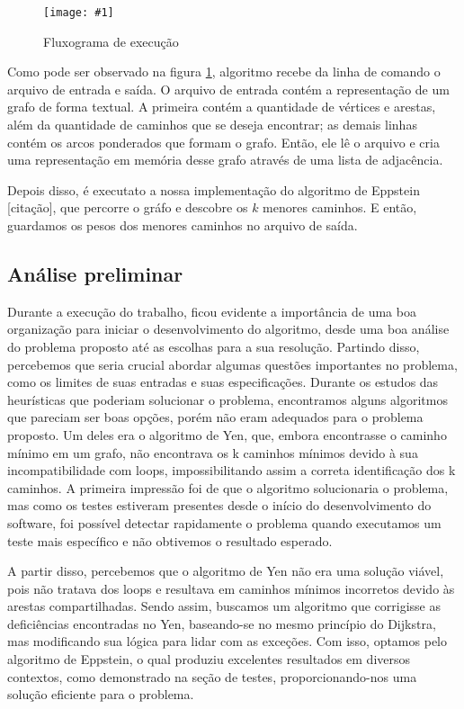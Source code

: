 \documentclass[12pt]{article}
\newcommand\image[2]{\noindent \begin{figure}[h]
    \texttt{[image: \#1]}
    \caption{#2}
    \label{fig: #1}
    \end{figure}
    }
\begin{document}
    \image{fluxo}{Fluxograma de execução}

    Como pode ser observado na figura \ref{fig: fluxo}, algoritmo recebe da linha de
    comando o arquivo de entrada e saída. O arquivo de entrada contém a
    representação de um grafo de forma textual. A primeira contém a quantidade
    de vértices e arestas, além da quantidade de caminhos que se deseja
    encontrar; as demais linhas contém os arcos ponderados que formam o grafo.
    Então, ele lê o arquivo e cria uma representação em memória desse grafo
    através de uma lista de adjacência.

    Depois disso, é executato a nossa implementação do algoritmo de Eppstein
    [citação], que percorre o gráfo e descobre os $k$ menores caminhos. E então,
    guardamos os pesos dos menores caminhos no arquivo de saída.

    \subsection{Análise preliminar}

    Durante a execução do trabalho, ficou evidente a importância de uma boa organização para iniciar o desenvolvimento do algoritmo, desde uma boa análise do problema proposto até as escolhas para a sua resolução. Partindo disso, percebemos que seria crucial abordar algumas questões importantes no problema, como os limites de suas entradas e suas especificações. Durante os estudos das heurísticas que poderiam solucionar o problema, encontramos alguns algoritmos que pareciam ser boas opções, porém não eram adequados para o problema proposto. Um deles era o algoritmo de Yen, que, embora encontrasse o caminho mínimo em um grafo, não encontrava os k caminhos mínimos devido à sua incompatibilidade com loops, impossibilitando assim a correta identificação dos k caminhos. A primeira impressão foi de que o algoritmo solucionaria o problema, mas como os testes estiveram presentes desde o início do desenvolvimento do software, foi possível detectar rapidamente o problema quando executamos um teste mais específico e não obtivemos o resultado esperado. 
    
    A partir disso, percebemos que o algoritmo de Yen não era uma solução viável, pois não tratava dos loops e resultava em caminhos mínimos incorretos devido às arestas compartilhadas. Sendo assim, buscamos um algoritmo que corrigisse as deficiências encontradas no Yen, baseando-se no mesmo princípio do Dijkstra, mas modificando sua lógica para lidar com as exceções. Com isso, optamos pelo algoritmo de Eppstein, o qual produziu excelentes resultados em diversos contextos, como demonstrado na seção de testes, proporcionando-nos uma solução eficiente para o problema.
\end{document}
